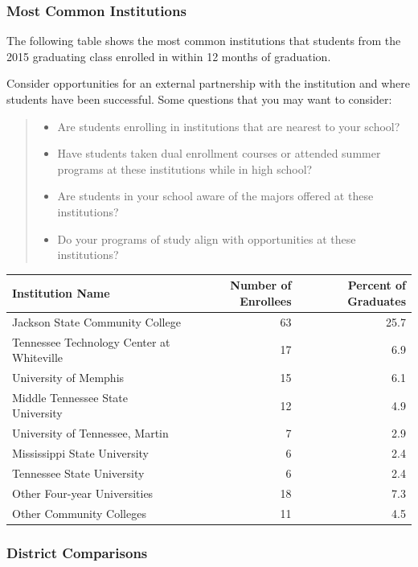 \documentclass[11pt,]{article}
\providecommand{\tightlist}{%
  \setlength{\itemsep}{0pt}\setlength{\parskip}{0pt}}
\begin{document}
\newpage

\subsubsection{Most Common Institutions}\label{most-common-institutions}

The following table shows the most common institutions that students
from the 2015 graduating class enrolled in within 12 months of
graduation.

Consider opportunities for an external partnership with the institution
and where students have been successful. Some questions that you may
want to consider:

\begin{quote}
\begin{itemize}
\tightlist
\item
  Are students enrolling in institutions that are nearest to your
  school?
\item
  Have students taken dual enrollment courses or attended summer
  programs at these institutions while in high school?
\item
  Are students in your school aware of the majors offered at these
  institutions?
\item
  Do your programs of study align with opportunities at these
  institutions?
\end{itemize}
\end{quote}

\begin{longtable}[]{@{}lrr@{}}
\toprule
Institution Name & Number of Enrollees & Percent of
Graduates\tabularnewline
\midrule
\endhead
Jackson State Community College & 63 & 25.7\tabularnewline
Tennessee Technology Center at Whiteville & 17 & 6.9\tabularnewline
University of Memphis & 15 & 6.1\tabularnewline
Middle Tennessee State University & 12 & 4.9\tabularnewline
University of Tennessee, Martin & 7 & 2.9\tabularnewline
Mississippi State University & 6 & 2.4\tabularnewline
Tennessee State University & 6 & 2.4\tabularnewline
Other Four-year Universities & 18 & 7.3\tabularnewline
Other Community Colleges & 11 & 4.5\tabularnewline
\bottomrule
\end{longtable}

\newpage 

\subsubsection{District Comparisons}\label{district-comparisons-1}
\end{document}
